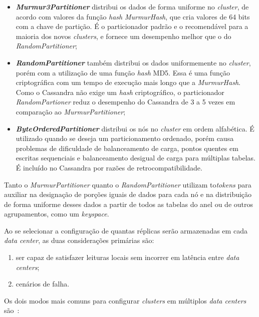 \begin{itemize}
\item \textbf{\emph{Murmur3Partitioner}} distribui os dados de forma uniforme no \emph{cluster}, de acordo com valores da função \emph{hash} \emph{MurmurHash}, que cria valores de 64 bits com a chave de partição. É o particionador padrão e o recomendável para a maioria dos novos \emph{clusters}, e fornece um desempenho melhor que o do \emph{RandomPartitioner};

\item \textbf{\emph{RandomPartitioner}} também distribui os dados uniformemente no \emph{cluster}, porém com a utilização de uma função \emph{hash} MD5. Essa é uma função criptográfica com um tempo de execução mais longo que a \emph{MurmurHash}. Como o Cassandra não exige um \emph{hash} criptográfico, o particionador \emph{RandomPartioner} reduz o desempenho do Cassandra de 3 a 5 vezes em comparação ao \emph{MurmurPartitioner};

\item \textbf{\emph{ByteOrderedPartitioner}} distribui os nós no \emph{cluster} em ordem alfabética. É utilizado quando se deseja um particionamento ordenado, porém causa problemas de dificuldade de balanceamento de carga, pontos quentes em escritas sequenciais e balanceamento desigual de carga para múltiplas tabelas. É incluído no Cassandra por razões de retrocompatibilidade.
\end{itemize}

Tanto o \emph{MurmurPartitioner} quanto o \emph{RandomPartitioner} utilizam to\emph{tokens} para auxiliar na designação de porções iguais de dados para cada nó e na distribuição de forma uniforme desses dados a partir de todos as tabelas do anel ou de outros agrupamentos, como um \emph{keyspace}.

Ao se selecionar a configuração de quantas réplicas serão armazenadas em cada \emph{data center}, as duas considerações primárias são:

\begin{enumerate}
\item ser capaz de satisfazer leituras locais sem incorrer em latência entre \emph{data centers};

\item cenários de falha.
\end{enumerate}

Os dois modos mais comuns para configurar \emph{clusters} em múltiplos \emph{data centers} são~\cite{cassandradocs}:

